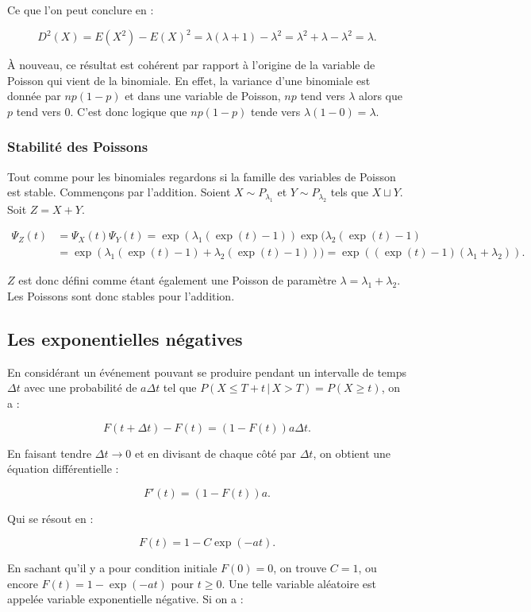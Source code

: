 \documentclass{article}
\begin{document}
			Ce que l'on peut conclure en :

			\[D^2(X) = E(X^2)-E(X)^2 = \lambda(\lambda+1) - \lambda^2 = \lambda^2 + \lambda - \lambda^2 = \lambda.\]

			À nouveau, ce résultat est cohérent par rapport à l'origine de la variable de Poisson qui vient de la binomiale. En effet, la variance d'une binomiale est donnée par
			$np(1-p)$ et dans une variable de Poisson, $np$ tend vers $\lambda$ alors que $p$ tend vers $0$. C'est donc logique que $np(1-p)$ tende vers $\lambda(1-0) = \lambda$.

		\subsubsection{Stabilité des Poissons}
			Tout comme pour les binomiales regardons si la famille des variables de Poisson est stable. Commençons par l'addition. Soient $X \sim P_{\lambda_1}$ et
			$Y \sim P_{\lambda_2}$ tels que $X \sqcup Y$. Soit $Z = X+Y$.

			\[\begin{aligned}
				\Psi_Z(t) &= \Psi_X(t)\Psi_Y(t) = \exp(\lambda_1(\exp(t)-1))\exp(\lambda_2(\exp(t)-1) \\
				&= \exp(\lambda_1(\exp(t)-1) + \lambda_2(\exp(t)-1))) = \exp((\exp(t)-1)(\lambda_1 + \lambda_2)).
			\end{aligned}\]

			$Z$ est donc défini comme étant également une Poisson de paramètre $\lambda = \lambda_1 + \lambda_2$. Les Poissons sont donc stables pour l'addition.

	\subsection{Les exponentielles négatives}
		En considérant un événement pouvant se produire pendant un intervalle de temps $\Delta t$ avec une probabilité de $a\Delta t$ tel que
		$P(X \leq T + t \, | \, X > T) = P(X \geq t)$, on a :

		\[F(t+\Delta t) - F(t) = (1-F(t))a\Delta t.\]

		En faisant tendre $\Delta t \to 0$ et en divisant de chaque côté par $\Delta t$, on obtient une équation différentielle :

		\[F'(t) = (1-F(t))a.\]

		Qui se résout en :

		\[F(t) = 1-C\exp(-at).\]

		En sachant qu'il y a pour condition initiale $F(0) = 0$, on trouve $C = 1$, ou encore $F(t) = 1 - \exp(-at)$ pour $t \geq 0$. Une telle variable aléatoire est appelée
		variable exponentielle négative. Si on a :
\end{document}
